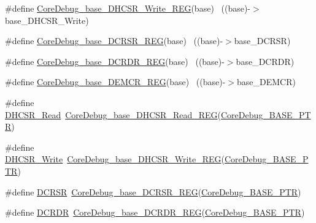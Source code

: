 \begin{DoxyCompactItemize}
\#define \hyperlink{group___core_debug___register___accessor___macros_gaf54a5a2086e1362b034c5ae9d566f261}{Core\+Debug\+\_\+base\+\_\+\+D\+H\+C\+S\+R\+\_\+\+Write\+\_\+\+R\+EG}(base)      ~((base)-\/$>$base\+\_\+\+D\+H\+C\+S\+R\+\_\+\+Write)
\item 
\#define \hyperlink{group___core_debug___register___accessor___macros_ga5f44f54e6c3b28720c9f888292d2eef5}{Core\+Debug\+\_\+base\+\_\+\+D\+C\+R\+S\+R\+\_\+\+R\+EG}(base)                  ~((base)-\/$>$base\+\_\+\+D\+C\+R\+SR)
\item 
\#define \hyperlink{group___core_debug___register___accessor___macros_gac60388e54792a5460ba042a1e6917ce7}{Core\+Debug\+\_\+base\+\_\+\+D\+C\+R\+D\+R\+\_\+\+R\+EG}(base)                  ~((base)-\/$>$base\+\_\+\+D\+C\+R\+DR)
\item 
\#define \hyperlink{group___core_debug___register___accessor___macros_ga068f04cd2820bf5a12caeb1c9f6afa51}{Core\+Debug\+\_\+base\+\_\+\+D\+E\+M\+C\+R\+\_\+\+R\+EG}(base)                  ~((base)-\/$>$base\+\_\+\+D\+E\+M\+CR)
\item 
\#define \hyperlink{group___core_debug___register___accessor___macros_ga7d77eafe76b2000c7159e58e11ade9a1}{D\+H\+C\+S\+R\+\_\+\+Read}~\hyperlink{group___core_debug___register___accessor___macros_gaea44925e7b9cc3155d55c86d77ecb8dc}{Core\+Debug\+\_\+base\+\_\+\+D\+H\+C\+S\+R\+\_\+\+Read\+\_\+\+R\+EG}(\hyperlink{group___core_debug___peripheral_ga994a185afca30ede538d89322c4f0326}{Core\+Debug\+\_\+\+B\+A\+S\+E\+\_\+\+P\+TR})
\item 
\#define \hyperlink{group___core_debug___register___accessor___macros_ga3c374ff0f88587d03fd707ebc0a06169}{D\+H\+C\+S\+R\+\_\+\+Write}~\hyperlink{group___core_debug___register___accessor___macros_gaf54a5a2086e1362b034c5ae9d566f261}{Core\+Debug\+\_\+base\+\_\+\+D\+H\+C\+S\+R\+\_\+\+Write\+\_\+\+R\+EG}(\hyperlink{group___core_debug___peripheral_ga994a185afca30ede538d89322c4f0326}{Core\+Debug\+\_\+\+B\+A\+S\+E\+\_\+\+P\+TR})
\item 
\#define \hyperlink{group___core_debug___register___accessor___macros_gabd5ddab120c0e09c0198d49c25713be3}{D\+C\+R\+SR}~\hyperlink{group___core_debug___register___accessor___macros_ga5f44f54e6c3b28720c9f888292d2eef5}{Core\+Debug\+\_\+base\+\_\+\+D\+C\+R\+S\+R\+\_\+\+R\+EG}(\hyperlink{group___core_debug___peripheral_ga994a185afca30ede538d89322c4f0326}{Core\+Debug\+\_\+\+B\+A\+S\+E\+\_\+\+P\+TR})
\item 
\#define \hyperlink{group___core_debug___register___accessor___macros_gaaa7a4f8f79faea1305f3398257c656a0}{D\+C\+R\+DR}~\hyperlink{group___core_debug___register___accessor___macros_gac60388e54792a5460ba042a1e6917ce7}{Core\+Debug\+\_\+base\+\_\+\+D\+C\+R\+D\+R\+\_\+\+R\+EG}(\hyperlink{group___core_debug___peripheral_ga994a185afca30ede538d89322c4f0326}{Core\+Debug\+\_\+\+B\+A\+S\+E\+\_\+\+P\+TR})

\end{DoxyCompactItemize}
